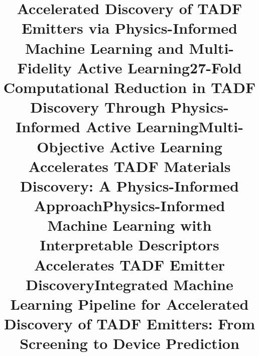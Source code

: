 
\title{Accelerated Discovery of TADF Emitters via Physics-Informed Machine Learning and Multi-Fidelity Active Learning}

\title{27-Fold Computational Reduction in TADF Discovery Through Physics-Informed Active Learning}

\title{Multi-Objective Active Learning Accelerates TADF Materials Discovery: A Physics-Informed Approach}

\title{Physics-Informed Machine Learning with Interpretable Descriptors Accelerates TADF Emitter Discovery}

\title{Integrated Machine Learning Pipeline for Accelerated Discovery of TADF Emitters: From Screening to Device Prediction}


